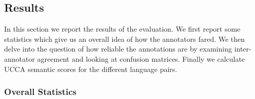 \documentclass[11pt]{article}
\begin{document}
%
%
% 
%

\newpage



\subsection{Results}


In this section we report the results of the evaluation. We first report some statistics which give us an overall idea
of how the annotators fared. We then delve into the question of how reliable the annotations are by examining
inter-annotator agreement and looking at confusion matrices. Finally we calculate UCCA semantic scores
for the different language pairs.  

\subsubsection{Overall Statistics}
\end{document}
